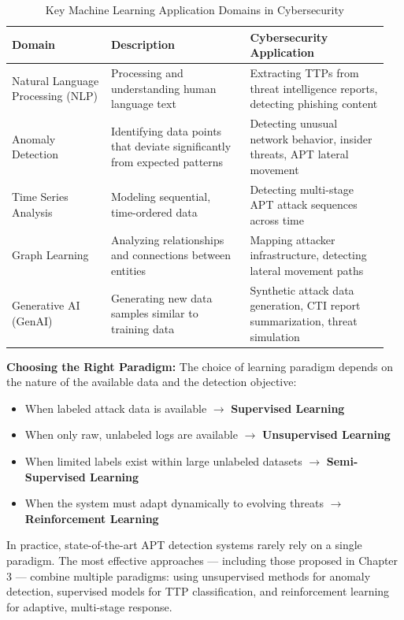 \begin{table}[H]
\centering
\caption{Key Machine Learning Application Domains in Cybersecurity}
\medskip
\label{tab:ml_domains}
\begin{tabular}{|p{0.25\linewidth}|p{0.35\linewidth}|p{0.35\linewidth}|}
\hline
\textbf{Domain} & \textbf{Description} & \textbf{Cybersecurity Application} \\ \hline
Natural Language Processing (NLP) & Processing and understanding human language text & Extracting TTPs from threat intelligence reports, detecting phishing content \\ \hline
Anomaly Detection & Identifying data points that deviate significantly from expected patterns & Detecting unusual network behavior, insider threats, APT lateral movement \\ \hline
Time Series Analysis & Modeling sequential, time-ordered data & Detecting multi-stage APT attack sequences across time \\ \hline
Graph Learning & Analyzing relationships and connections between entities & Mapping attacker infrastructure, detecting lateral movement paths \\ \hline
Generative AI (GenAI) & Generating new data samples similar to training data & Synthetic attack data generation, CTI report summarization, threat simulation \\ \hline
\end{tabular}

\end{table}

\textbf{Choosing the Right Paradigm:}
The choice of learning paradigm depends on the nature of the available data and the detection objective:
\begin{itemize}
    \item When labeled attack data is available $\rightarrow$ \textbf{Supervised Learning}
    \item When only raw, unlabeled logs are available $\rightarrow$ \textbf{Unsupervised Learning}
    \item When limited labels exist within large unlabeled datasets $\rightarrow$ \textbf{Semi-Supervised Learning}
    \item When the system must adapt dynamically to evolving threats $\rightarrow$ \textbf{Reinforcement Learning}
\end{itemize}

 In practice, state-of-the-art APT detection systems rarely rely on a single paradigm. The most effective approaches --- including those proposed in Chapter 3 --- combine multiple paradigms: using unsupervised methods for anomaly detection, supervised models for TTP classification, and reinforcement learning for adaptive, multi-stage response.

